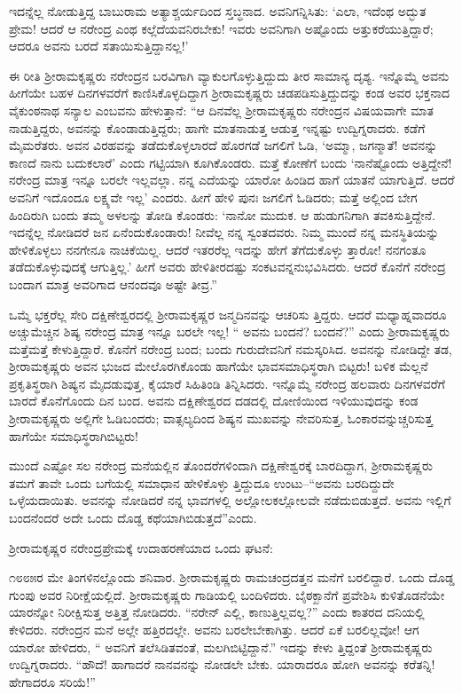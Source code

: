ಇದನ್ನೆಲ್ಲ ನೋಡುತ್ತಿದ್ದ ಬಾಬುರಾಮ ಅತ್ಯಾಶ್ಚರ್ಯದಿಂದ ಸ್ತಬ್ಧನಾದ. ಅವನಿಗನ್ನಿಸಿತು: ‘ಎಲಾ, ಇದೆಂಥ ಅದ್ಭುತ ಪ್ರೇಮ! ಆದರೆ ಆ ನರೇಂದ್ರ ಎಂಥ ಕಲ್ಲೆದೆಯವನಿರಬೇಕು! ಇವರು ಅವನಿಗಾಗಿ ಅಷ್ಟೊಂದು ಅತ್ತುಕರೆಯುತ್ತಿದ್ದಾರೆ; ಆದರೂ ಅವನು ಬರದೆ ಸತಾಯಿಸುತ್ತಿದ್ದಾನಲ್ಲ!’

ಈ ರೀತಿ ಶ್ರೀರಾಮಕೃಷ್ಣರು ನರೇಂದ್ರನ ಬರವಿಗಾಗಿ ವ್ಯಾಕುಲಗೊಳ್ಳುತ್ತಿದ್ದುದು ತೀರ ಸಾಮಾನ್ಯ ದೃಶ್ಯ. ಇನ್ನೊಮ್ಮೆ ಅವನು ಹೀಗೆಯೇ ಬಹಳ ದಿನಗಳವರೆಗೆ ಕಾಣಿಸಿಕೊಳ್ಳದಿದ್ದಾಗ ಶ್ರೀರಾಮಕೃಷ್ಣರು ಚಡಪಡಿಸುತ್ತಿದ್ದುದನ್ನು ಕಂಡ ಅವರ ಭಕ್ತನಾದ ವೈಕುಂಠನಾಥ ಸನ್ಯಾಲ ಎಂಬವನು ಹೇಳುತ್ತಾನೆ: “ಆ ದಿನವೆಲ್ಲ ಶ್ರೀರಾಮಕೃಷ್ಣರು ನರೇಂದ್ರನ ವಿಷಯವಾಗೇ ಮಾತ ನಾಡುತ್ತಿದ್ದರು, ಅವನನ್ನು ಕೊಂಡಾಡುತ್ತಿದ್ದರು; ಹಾಗೇ ಮಾತನಾಡುತ್ತ ಆಡುತ್ತ ಇನ್ನಷ್ಟು ಉದ್ವಿಗ್ನರಾದರು. ಕಡೆಗೆ ಮೈಮರೆತರು. ಅವನ ವಿರಹವನ್ನು ತಡೆದುಕೊಳ್ಳಲಾರದೆ ಹೊರಗಡೆ ಜಗಲಿಗೆ ಓಡಿ, ‘ಅಮ್ಮಾ, ಜಗನ್ಮಾತೆ! ಅವನನ್ನು ಕಾಣದೆ ನಾನು ಬದುಕಲಾರೆ’ ಎಂದು ಗಟ್ಟಿಯಾಗಿ ಕೂಗಿಕೊಂಡರು. ಮತ್ತೆ ಕೋಣೆಗೆ ಬಂದು ‘ನಾನೆಷ್ಟೊಂದು ಅತ್ತಿದ್ದೇನೆ! ನರೇಂದ್ರ ಮಾತ್ರ ಇನ್ನೂ ಬರಲೇ ಇಲ್ಲವಲ್ಲಾ. ನನ್ನ ಎದೆಯನ್ನು ಯಾರೋ ಹಿಂಡಿದ ಹಾಗೆ ಯಾತನೆ ಯಾಗುತ್ತಿದೆ. ಆದರೆ ಅವನಿಗೆ ಇದೊಂದೂ ಲಕ್ಷ್ಯವೇ ಇಲ್ಲ’ ಎಂದರು. ಹೀಗೆ ಹೇಳಿ ಪುನಃ ಜಗಲಿಗೆ ಓಡಿದರು; ಮತ್ತೆ ಅಲ್ಲಿಂದ ಬೇಗ ಹಿಂದಿರುಗಿ ಬಂದು ತಮ್ಮ ಅಳಲನ್ನು ತೋಡಿ ಕೊಂಡರು: ‘ನಾನೋ ಮುದುಕ. ಆ ಹುಡುಗನಿಗಾಗಿ ತವಕಿಸುತ್ತಿದ್ದೇನೆ. ಇದನ್ನೆಲ್ಲ ನೋಡಿದರೆ ಜನ ಏನೆಂದುಕೊಂಡಾರು! ನೀವೆಲ್ಲ ನನ್ನ ಸ್ವಂತದವರು. ನಿಮ್ಮ ಮುಂದೆ ನನ್ನ ಮನಸ್ಥಿತಿಯನ್ನು ಹೇಳಿಕೊಳ್ಳಲು ನನಗೇನೂ ನಾಚಿಕೆಯಿಲ್ಲ. ಆದರೆ ಇತರರೆಲ್ಲ ಇದನ್ನು ಹೇಗೆ ತೆಗೆದುಕೊಳ್ಳು ತ್ತಾರೋ! ನನಗಂತೂ ತಡೆದುಕೊಳ್ಳುವುದಕ್ಕೆ ಆಗುತ್ತಿಲ್ಲ.’ ಹೀಗೆ ಅವರು ಹೇಳಿತೀರದಷ್ಟು ಸಂಕಟವನ್ನನುಭವಿಸಿದರು. ಆದರೆ ಕೊನೆಗೆ ನರೇಂದ್ರ ಬಂದಾಗ ಮಾತ್ರ ಅವರಿಗಾದ ಆನಂದವೂ ಅಷ್ಟೇ ತೀವ್ರ.”

ಒಮ್ಮೆ ಭಕ್ತರೆಲ್ಲ ಸೇರಿ ದಕ್ಷಿಣೇಶ್ವರದಲ್ಲಿ ಶ್ರೀರಾಮಕೃಷ್ಣರ ಜನ್ಮದಿನವನ್ನು ಆಚರಿಸು ತ್ತಿದ್ದರು. ಆದರೆ ಮಧ್ಯಾಹ್ನವಾದರೂ ಅಚ್ಚುಮೆಚ್ಚಿನ ಶಿಷ್ಯ ನರೇಂದ್ರ ಮಾತ್ರ ಇನ್ನೂ ಬರಲೇ ಇಲ್ಲ! “ ಅವನು ಬಂದನೆ? ಬಂದನೆ?” ಎಂದು ಶ್ರೀರಾಮಕೃಷ್ಣರು ಮತ್ತೆಮತ್ತೆ ಕೇಳುತ್ತಿದ್ದಾರೆ. ಕೊನೆಗೆ ನರೇಂದ್ರ ಬಂದ; ಬಂದು ಗುರುದೇವನಿಗೆ ನಮಸ್ಕರಿಸಿದ. ಅವನನ್ನು ನೋಡಿದ್ದೇ ತಡ, ಶ್ರೀರಾಮಕೃಷ್ಣರು ಅವನ ಭುಜದ ಮೇಲೊರಗಿಕೊಂಡು ಹಾಗೆಯೇ ಭಾವಸಮಾಧಿಸ್ಥರಾಗಿ ಬಿಟ್ಟರು! ಬಳಿಕ ಮೆಲ್ಲನೆ ಪ್ರಕೃತಿಸ್ಥರಾಗಿ ಶಿಷ್ಯನ ಮೈದಡುವುತ್ತ, ಕೈಯಾರೆ ಸಿಹಿತಿಂಡಿ ತಿನ್ನಿಸಿದರು. ಇನ್ನೊಮ್ಮೆ ನರೇಂದ್ರ ಹಲವಾರು ದಿನಗಳವರೆಗೆ ಬಾರದೆ ಕೊನೆಗೊಂದು ದಿನ ಬಂದ. ಅವನು ದಕ್ಷಿಣೇಶ್ವರದ ದಡದಲ್ಲಿ ದೋಣಿಯಿಂದ ಇಳಿಯುವುದನ್ನು ಕಂಡ ಶ್ರೀರಾಮಕೃಷ್ಣರು ಅಲ್ಲಿಗೇ ಓಡಿಬಂದರು; ವಾತ್ಸಲ್ಯದಿಂದ ಶಿಷ್ಯನ ಮುಖವನ್ನು ನೇವರಿಸುತ್ತ, ಓಂಕಾರವನ್ನುಚ್ಚರಿಸುತ್ತ ಹಾಗೆಯೇ ಸಮಾಧಿಸ್ಥರಾಗಿಬಿಟ್ಟರು!

ಮುಂದೆ ಎಷ್ಟೋ ಸಲ ನರೇಂದ್ರ ಮನೆಯಲ್ಲಿನ ತೊಂದರೆಗಳಿಂದಾಗಿ ದಕ್ಷಿಣೇಶ್ವರಕ್ಕೆ ಬಾರದಿದ್ದಾಗ, ಶ್ರೀರಾಮಕೃಷ್ಣರು ತಮಗೆ ತಾವೇ ಒಂದು ಬಗೆಯಲ್ಲಿ ಸಮಾಧಾನ ಹೇಳಿಕೊಳ್ಳು ತ್ತಿದ್ದುದೂ ಉಂಟು–“ಅವನು ಬರದಿದ್ದುದೇ ಒಳ್ಳೆಯದಾಯಿತು. ಅವನನ್ನು ನೋಡಿದರೆ ನನ್ನ ಭಾವಗಳಲ್ಲಿ ಅಲ್ಲೋಲಕಲ್ಲೋಲವೇ ನಡೆದುಬಿಡುತ್ತದೆ. ಅವನು ಇಲ್ಲಿಗೆ ಬಂದನೆಂದರೆ ಅದೇ ಒಂದು ದೊಡ್ಡ ಕಥೆಯಾಗಿಬಿಡುತ್ತದೆ”ಎಂದು.

ಶ್ರೀರಾಮಕೃಷ್ಣರ ನರೇಂದ್ರಪ್ರೇಮಕ್ಕೆ ಉದಾಹರಣೆಯಾದ ಒಂದು ಘಟನೆ:

೧೮೮೫ರ ಮೇ ತಿಂಗಳಿನಲ್ಲೊಂದು ಶನಿವಾರ. ಶ್ರೀರಾಮಕೃಷ್ಣರು ರಾಮಚಂದ್ರದತ್ತನ ಮನೆಗೆ ಬರಲಿದ್ದಾರೆ. ಒಂದು ದೊಡ್ಡ ಗುಂಪು ಅವರ ನಿರೀಕ್ಷೆಯಲ್ಲಿದೆ. ಶ್ರೀರಾಮಕೃಷ್ಣರು ಗಾಡಿಯಲ್ಲಿ ಬಂದಿಳಿದರು. ಬೈಠಕ್ಖಾನೆಗೆ ಪ್ರವೇಶಿಸಿ ಕುಳಿತೊಡನೆಯೇ ಯಾರನ್ನೋ ನಿರೀಕ್ಷಿಸುತ್ತ ಅತ್ತಿತ್ತ ನೋಡಿದರು. “ನರೇನ್ ಎಲ್ಲಿ, ಕಾಣುತ್ತಿಲ್ಲವಲ್ಲ?” ಎಂದು ಕಾತರದ ದನಿಯಲ್ಲಿ ಕೇಳಿದರು. ನರೇಂದ್ರನ ಮನೆ ಅಲ್ಲೇ ಹತ್ತಿರದಲ್ಲೇ. ಅವನು ಬರಲೇಬೇಕಾಗಿತ್ತು. ಆದರೆ ಏಕೆ ಬರಲಿಲ್ಲವೋ! ಆಗ ಯಾರೋ ಹೇಳಿದರು, “ ಅವನಿಗೆ ತಲೆಸಿಡಿತವಂತೆ, ಮಲಗಿಬಿಟ್ಟಿದ್ದಾನೆ.” ಇದನ್ನು ಕೇಳು ತ್ತಿದ್ದಂತೆ ಶ್ರೀರಾಮಕೃಷ್ಣರು ಉದ್ವಿಗ್ನರಾದರು. “ಹೌದೆ! ಹಾಗಾದರೆ ನಾನವನನ್ನು ನೋಡಲೇ ಬೇಕು. ಯಾರಾದರೂ ಹೋಗಿ ಅವನನ್ನು ಕರೆತನ್ನಿ! ಹೇಗಾದರೂ ಸರಿಯೆ!”

